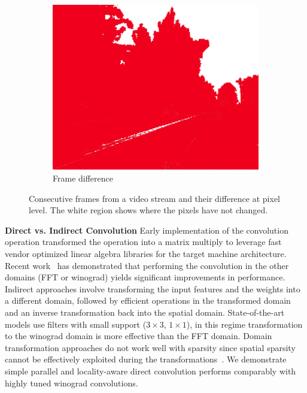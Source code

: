 \documentclass{article}
\begin{document}
\begin{figure}[h]
\begin{subfigure}{0.3\textwidth}
	\includegraphics[width=\textwidth]{diff.jpg}
	\caption{Frame difference}
\end{subfigure}
\caption{Consecutive frames from a video stream and their difference at pixel
    level. The white region shows where the pixels have not changed.}
\label{fig:frames}
\end{figure}

\textbf{Direct vs. Indirect Convolution} Early implementation of the convolution
operation transformed the operation into a matrix multiply to leverage fast
vendor optimized linear algebra libraries for the target machine architecture.
Recent work~\cite{vasilache2014fast, lavin2016fast} has demonstrated that
performing the convolution in the other domains (FFT or winograd) yields
significant improvements in performance.  Indirect approaches involve
transforming the input features and the weights into a different domain,
followed by efficient operations in the transformed domain and an inverse
transformation back into the spatial domain. State-of-the-art models use filters
with small support ($3 \times 3$, $1 \times 1$), in this regime transformation
to the winograd domain is more effective than the FFT domain. Domain
transformation approaches do not work well with sparsity since spatial sparsity
cannot be effectively exploited during the
transformations~\cite{liu2018efficient}.  We demonstrate simple parallel and
locality-aware direct convolution performs comparably with highly tuned winograd
convolutions.
\end{document}
